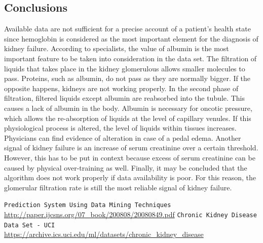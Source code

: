 \documentclass[10pt]{article}
\begin{document}
\subsection{Conclusions}
Available data are not sufficient for a precise account of a patient's health state since hemoglobin is considered as the most important element for the diagnosis of kidney failure. 
According to specialists, the value of albumin is the most important feature to be taken into consideration in the data set. The filtration of liquids that takes place in the kidney glomerulous allows smaller molecules to pass. Proteins, such as albumin, do not pass as they are normally bigger. If the opposite happens, kidneys are not working properly. In the second phase of filtration, filtered liquids except albumin are reabsorbed into the tubule. This causes a lack of albumin in the body. Albumin is necessary for oncotic pressure, which allows the re-absorption of liquids at the level of capillary venules. If this physiological process is altered, the level of liquids within tissues increases. Physicians can find evidence of alteration in case of a pedal edema. 
Another signal of kidney failure is an increase of serum creatinine over a certain threshold. However, this has to be put in context because excess of serum creatinine can be caused by physical over-training as well.
Finally, it may be concluded that the algorithm does not work properly if data availability is poor. For this reason, the glomerular filtration rate is still the most reliable signal of kidney failure.

\begin{thebibliography}{99}
 \texttt{Prediction System Using Data Mining Techniques}\\\url{http://paper.ijcsns.org/07_book/200808/20080849.pdf}
 \texttt{Chronic Kidney Disease Data Set - UCI}\\\url{https://archive.ics.uci.edu/ml/datasets/chronic_kidney_disease}
\end{thebibliography}


\pagebreak
\end{document}
